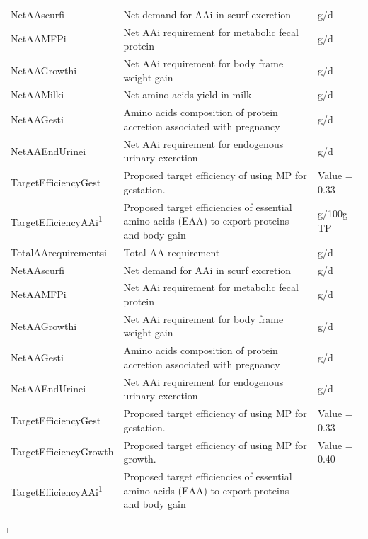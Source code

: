 \begin{refsection}
\begin{longtable}{@{} L{5cm} L{5.5cm} L{2.5cm} @{}}
NetAAscurfi &  Net demand for AAi in scurf excretion  &  g/d\\
NetAAMFPi &   Net AAi requirement for metabolic fecal protein  &  g/d\\
NetAAGrowthi &   Net AAi requirement for body frame weight gain &   g/d\\
NetAAMilki &   Net amino acids yield in milk  &  g/d\\
NetAAGesti &   Amino acids composition of protein accretion associated with pregnancy &   g/d\\
NetAAEndUrinei &   Net AAi requirement for endogenous urinary excretion &   g/d\\
TargetEfficiencyGest &   Proposed target efficiency of using MP for gestation.  &  Value = 0.33 \\

TargetEfficiencyAAi\textsuperscript{1} & Proposed target efficiencies of essential amino acids (EAA) to export proteins and body gain  &  g/100g TP \\
TotalAArequirementsi &  Total AA requirement &  g/d\\
NetAAscurfi &  Net demand for AAi in scurf excretion  & g/d\\
NetAAMFPi &  Net AAi requirement for metabolic fecal protein  & g/d\\
NetAAGrowthi &  Net AAi requirement for body frame weight gain &  g/d\\
NetAAGesti &  Amino acids composition of protein accretion associated with pregnancy &  g/d\\
NetAAEndUrinei &  Net AAi requirement for endogenous urinary excretion  & g/d\\
TargetEfficiencyGest &  Proposed target efficiency of using MP for gestation.  & Value = 0.33\\
TargetEfficiencyGrowth &  Proposed target efficiency of using MP for growth.  & Value = 0.40\\
TargetEfficiencyAAi\textsuperscript{1} &  Proposed target efficiencies of essential amino acids (EAA) to export proteins and body gain  &  -\\
    \end{longtable}
\vspace{-0.5cm}

\begin{flushleft}
\textsuperscript{1} \cite{nrc2021}
\end{flushleft}






\end{refsection}

